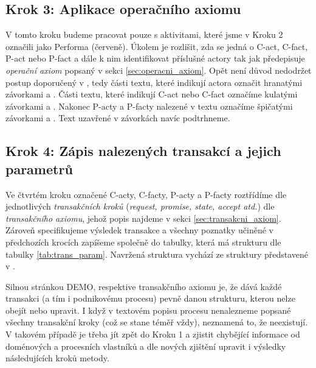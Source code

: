 \documentclass[]{article}
\begin{document}
\subsection{Krok 3: Aplikace operačního axiomu} \label{sec:st3_opax}
V tomto kroku budeme pracovat pouze s aktivitami, které jsme v Kroku 2 označili jako Performa (červeně). Úkolem je rozlišit, zda se jedná o C-act, C-fact, P-act nebo P-fact a dále k nim identifikovat příslušné actory tak jak předepisuje \textit{operační axiom} popsaný v sekci \ref{sec:operacni_axiom}. Opět není důvod nedodržet postup doporučený v \cite{Dietz2006}, tedy části textu, které indikují actora označit hranatými závorkami \uv{[} a \uv{]}. Části textu, které indikují C-act nebo C-fact označíme kulatými závorkami \uv{(} a \uv{)}. Nakonec P-acty a P-facty nalezené v textu označíme špičatými závorkami \uv{$<$}  a \uv{$>$}. Text uzavřené v závorkách navíc podtrhneme.

\subsection{Krok 4: Zápis nalezených transakcí a jejich parametrů}
Ve čtvrtém kroku označené C-acty, C-facty, P-acty a P-facty roztřídíme dle jednotlivých \textit{transakčních kroků} (\textit{request, promise, state, accept atd.}) dle \textit{transakčního axiomu}, jehož popis najdeme v sekci \ref{sec:transakcni_axiom}. Zároveň specifikujeme výsledek transakce a všechny poznatky učiněné v předchozích krocích zapíšeme společně do tabulky, která má strukturu dle tabulky \ref{tab:trans_param}. Navržená struktura vychází ze struktury představené v \cite{Naplava2015}.

Silnou stránkou DEMO, respektive transakčního axiomu je, že dává každé transakci (a tím i podnikovému procesu) pevně danou strukturu, kterou nelze obejít nebo upravit. I když v textovém popisu procesu nenalezneme popsané všechny transakční kroky (což se stane téměř vždy), neznamená to, že neexistují. V takovém případě je třeba jít zpět do Kroku 1 a zjistit chybějící informace od doménových a procesních vlastníků a dle nových zjištění upravit i výsledky následujících kroků metody.
\end{document}
